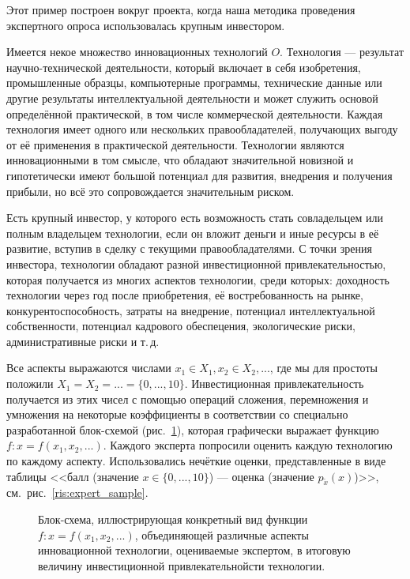 \documentclass{article}
\begin{document}
Этот пример построен вокруг проекта, когда наша методика проведения экспертного опроса использовалась крупным инвестором.

Имеется некое множество инновационных технологий $O$. Технология --- результат научно-технической деятельности, который включает в себя изобретения, промышленные образцы, компьютерные программы, технические данные или другие результаты интеллектуальной деятельности и может служить основой определённой практической, в том числе коммерческой деятельности. Каждая технология имеет одного или нескольких правообладателей, получающих выгоду от её применения в практической деятельности. Технологии являются инновационными в том смысле, что обладают значительной новизной и гипотетически имеют большой потенциал для развития, внедрения и получения прибыли, но всё это сопровождается значительным риском. 

Есть крупный инвестор, у которого есть возможность стать совладельцем или полным владельцем технологии, если он вложит деньги и иные ресурсы в её развитие, вступив в сделку с текущими правообладателями. С точки зрения инвестора, технологии обладают разной инвестиционной привлекательностью, которая получается из многих аспектов технологии, среди которых: доходность технологии через год после приобретения, её востребованность на рынке, конкурентоспособность, затраты на внедрение, потенциал интеллектуальной собственности, потенциал кадрового обеспецения, экологические риски, административные риски и т.\,д.

Все аспекты выражаются числами $x_1 \in X_1, x_2 \in X_2, ...$, где мы для простоты положили $X_1 = X_2 = ... = \{0, ..., 10\}$. Инвестиционная привлекательность получается из этих чисел с помощью операций сложения, перемножения и умножения на некоторые коэффициенты в соответствии со специально разработанной блок-схемой (рис.~\ref{ris:tech_scheme}), которая графически выражает функцию $f: x = f(x_1, x_2, ...)$. Каждого эксперта попросили оценить каждую технологию по каждому аспекту. Использовались нечёткие оценки, представленные в виде таблицы <<балл (значение $x \in \{0, ..., 10\}$) --- оценка (значение $p_{\tilde x}(x)$)>>, см.~рис.~\ref{ris:expert_sample}.  

\begin{figure}[H]
\caption{\small Блок-схема, иллюстрирующая конкретный вид функции $f: x = f(x_1, x_2, ...)$, объединяющей различные аспекты инновационной технологии, оцениваемые экспертом, в итоговую величину инвестиционной привлекательнойсти технологии. }
\label{ris:tech_scheme}
\end{figure}
\end{document}
